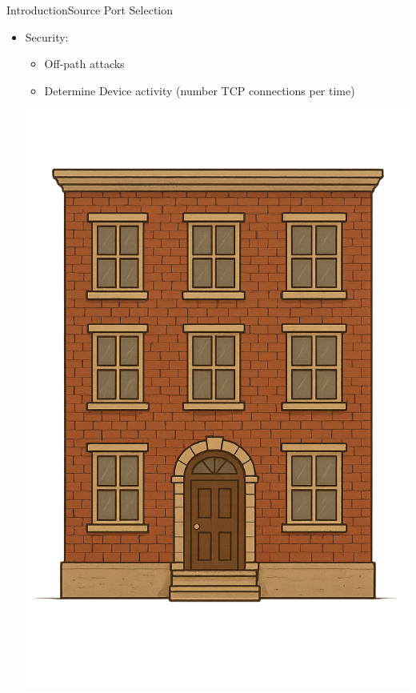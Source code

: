 \documentclass[aspectratio=169, hyperref={colorlinks=true, allcolors=SecondaryColor}, c]{beamer}
\begin{document}
\begin{frame}[fragile]{Introduction}{Source Port Selection}
	\begin{itemize}
		\item \alert{Security:}
		\begin{itemize}
			\item \alert{Off-path attacks} %
			\item Determine \alert{Device activity (number TCP connections per time)} %
		\end{itemize}
		\begin{transformation}[0.2][0.6][0.2]
			\includegraphics[width=\textwidth]{./figures/apartment1.png}

\end{transformation}
\end{itemize}
\end{frame}
\end{document}
